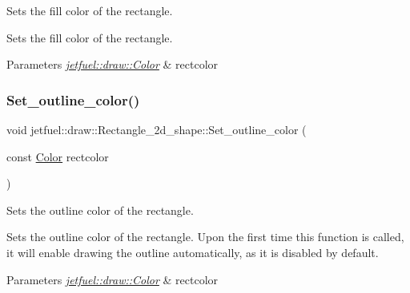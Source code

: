 Sets the fill color of the rectangle. 

Sets the fill color of the rectangle.


\begin{DoxyParams}{Parameters}
{\em \hyperlink{classjetfuel_1_1draw_1_1Color}{jetfuel\+::draw\+::\+Color}} & rectcolor \\
\hline
\end{DoxyParams}
\mbox{\label{classjetfuel_1_1draw_1_1Rectangle__2d__shape_a7a090088081738c7f342e193e519de5a}} 
\subsubsection{\texorpdfstring{Set\+\_\+outline\+\_\+color()}{Set\_outline\_color()}}
{\footnotesize\ttfamily void jetfuel\+::draw\+::\+Rectangle\+\_\+2d\+\_\+shape\+::\+Set\+\_\+outline\+\_\+color (\begin{DoxyParamCaption}\item[{const \hyperlink{classjetfuel_1_1draw_1_1Color}{Color}}]{rectcolor }\end{DoxyParamCaption})\hspace{0.3cm}{\ttfamily [inline]}}



Sets the outline color of the rectangle. 

Sets the outline color of the rectangle. Upon the first time this function is called, it will enable drawing the outline automatically, as it is disabled by default.


\begin{DoxyParams}{Parameters}
{\em \hyperlink{classjetfuel_1_1draw_1_1Color}{jetfuel\+::draw\+::\+Color}} & rectcolor \\
\hline
\end{DoxyParams}
\mbox{\label{classjetfuel_1_1draw_1_1Rectangle__2d__shape_a375b0892589ef7cd1762576e9ce96875}} 
